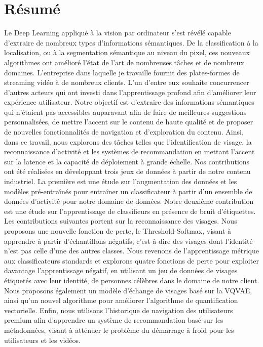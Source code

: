 \chapter*{Résumé}
Le Deep Learning appliqué à la vision par ordinateur s'est révélé capable d'extraire de nombreux types d'informations sémantiques. De la classification à la localisation, ou à la segmentation sémantique au niveau du pixel, ces nouveaux algorithmes ont amélioré l'état de l'art de nombreuses tâches et de nombreux domaines. L'entreprise dans laquelle je travaille fournit des plates-formes de streaming vidéo à de nombreux clients. L'un d'entre eux souhaite concurrencer d'autres acteurs qui ont investi dans l'apprentissage profond afin d'améliorer leur expérience utilisateur. Notre objectif est d'extraire des informations sémantiques qui n'étaient pas accessibles auparavant afin de faire de meilleures suggestions personnalisées, de mettre l'accent sur le contenu de haute qualité et de proposer de nouvelles fonctionnalités de navigation et d'exploration du contenu. Ainsi, dans ce travail, nous explorons des tâches telles que l'identification de visage, la reconnaissance d'activité et les systèmes de recommandation en mettant l'accent sur la latence et la capacité de déploiement à grande échelle. Nos contributions ont été réalisées en développant trois jeux de données à partir de notre contenu industriel. La première est une étude sur l'augmentation des données et les modèles pré-entraînés pour entraîner un classificateur à partir d'un ensemble de données d'activité pour notre domaine de données. Notre deuxième contribution est une étude sur l'apprentissage de classifieurs en présence de bruit d'étiquettes. Les contributions suivantes portent sur la reconnaissance des visages. Nous proposons une nouvelle fonction de perte, le Threshold-Softmax, visant à apprendre à partir d'échantillons négatifs, c'est-à-dire des visages dont l'identité n'est pas celle d'une des autres classes. Nous revenons de l'apprentissage métrique aux classificateurs standards et explorons quatre fonctions de perte pour exploiter davantage l'apprentissage négatif, en utilisant un jeu de données de visages étiquetés avec leur identité, de personnes célèbres dans le domaine de notre client. Nous proposons également un modèle d'échange de visages basé sur la VQVAE, ainsi qu'un nouvel algorithme pour améliorer l'algorithme de quantification vectorielle. Enfin, nous utilisons l'historique de navigation des utilisateurs premium afin d'apprendre un système de recommandation basé sur les métadonnées, visant à atténuer le problème du démarrage à froid pour les utilisateurs et les vidéos.

